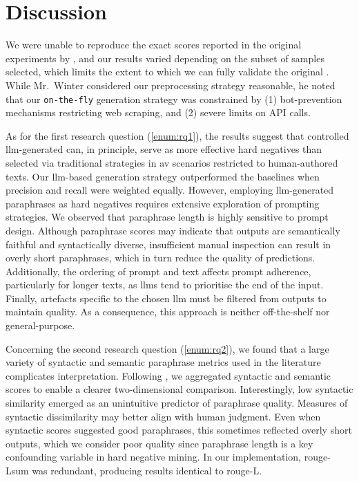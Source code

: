 \chapter{Discussion}
\label{chap:discussion}

We were unable to reproduce the exact scores reported in the original experiments by \citet{koppel_determining_2014}, and our results varied depending on the subset of samples selected, 
which limits the extent to which we can fully validate the original \impAppr{}. 
While Mr.\ Winter considered our preprocessing strategy reasonable, he noted that our \texttt{on-the-fly} \imp{} generation strategy was constrained by (1) bot-prevention mechanisms restricting web scraping, and (2) severe limits on API calls.  

As for the first research question (\ref{enum:rq1}), the results suggest that controlled \ac{llm}-generated \imps{} can, in principle, serve as more effective hard negatives than \imp{} selected via traditional strategies in \ac{av} scenarios restricted to human-authored texts. 
Our \ac{llm}-based \imp{} generation strategy outperformed the baselines when precision and recall were weighted equally.  
However, employing \ac{llm}-generated paraphrases as hard negatives requires extensive exploration of prompting strategies.  
We observed that paraphrase length is highly sensitive to prompt design. 
Although paraphrase scores may indicate that outputs are semantically faithful and syntactically diverse, insufficient manual inspection can result in overly short paraphrases, which in turn reduce the quality of predictions.  
Additionally, the ordering of prompt and text affects prompt adherence, particularly for longer texts, as \acp{llm} tend to prioritise the end of the input.  
Finally, artefacts specific to the chosen \ac{llm} must be filtered from outputs to maintain quality. 
As a consequence, this approach is neither off-the-shelf nor general-purpose. 

Concerning the second research question (\ref{enum:rq2}), we found that a large variety of syntactic and semantic paraphrase metrics used in the literature complicates interpretation. 
Following \citet{gohsen_captions_2023}, we aggregated syntactic and semantic scores to enable a clearer two-dimensional comparison.  
Interestingly, low syntactic similarity emerged as an unintuitive predictor of paraphrase quality. 
Measures of syntactic dissimilarity may better align with human judgment.  
Even when syntactic scores suggested good paraphrases, this sometimes reflected overly short outputs, which we consider poor quality since paraphrase length is a key confounding variable in hard negative mining.  
In our implementation, \ac{rouge}-Lsum was redundant, producing results identical to \ac{rouge}-L.  

